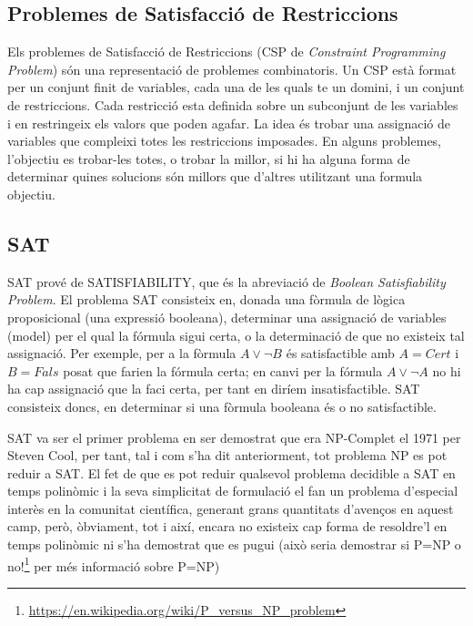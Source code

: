 \documentclass[11pt,a4paper,twoside]{report}
\begin{document}
 

  \subsection{Problemes de Satisfacció de Restriccions}
  
  Els problemes de Satisfacció de Restriccions (CSP de \textit{Constraint Programming Problem}) són una representació de problemes combinatoris. Un CSP està format per un conjunt finit de variables, cada una de les quals te un domini, i un conjunt de restriccions. Cada restricció esta definida sobre un subconjunt de les variables i en restringeix els valors que poden agafar. 
  La idea és trobar una assignació de variables que compleixi totes les restriccions imposades. En alguns problemes, l'objectiu es trobar-les totes, o trobar la millor, si hi ha alguna forma de determinar quines solucions són millors que d'altres utilitzant una formula objectiu.
  
  \subsection{SAT}

  SAT prové de SATISFIABILITY, que és la abreviació de \textit{Boolean Satisfiability Problem}. 
  El problema SAT consisteix en, donada una fòrmula de lògica proposicional (una expressió booleana), determinar una assignació de variables (model) per el qual la fórmula sigui certa, o la determinació de que no existeix tal assignació.
  Per exemple, per a la fòrmula $A \vee \neg B$ és satisfactible amb $A = Cert$ i $B = Fals$ posat que farien la fórmula certa; en canvi per la fórmula $A \vee \neg A$ no hi ha cap assignació que la faci certa, per tant en diríem insatisfactible. 
  SAT consisteix doncs, en determinar si una fòrmula booleana és o no satisfactible.
  
  SAT va ser el primer problema en ser demostrat que era NP-Complet el 1971 per Steven Cool\cite{cook1971complexity}, per tant, tal i com s'ha dit anteriorment, tot problema NP es pot reduir a SAT.
  El fet de que es pot reduir qualsevol problema decidible a SAT en temps polinòmic i la seva simplicitat de formulació el fan un problema d'especial interès en la comunitat científica, generant grans quantitats d'avenços en aquest camp, 
  però, òbviament, tot i així, encara no existeix cap forma de resoldre'l en temps polinòmic ni s'ha demostrat que es pugui (això seria demostrar si P=NP o no!\footnote{\url{https://en.wikipedia.org/wiki/P_versus_NP_problem}} per més informació sobre P=NP)
  
\end{document}
